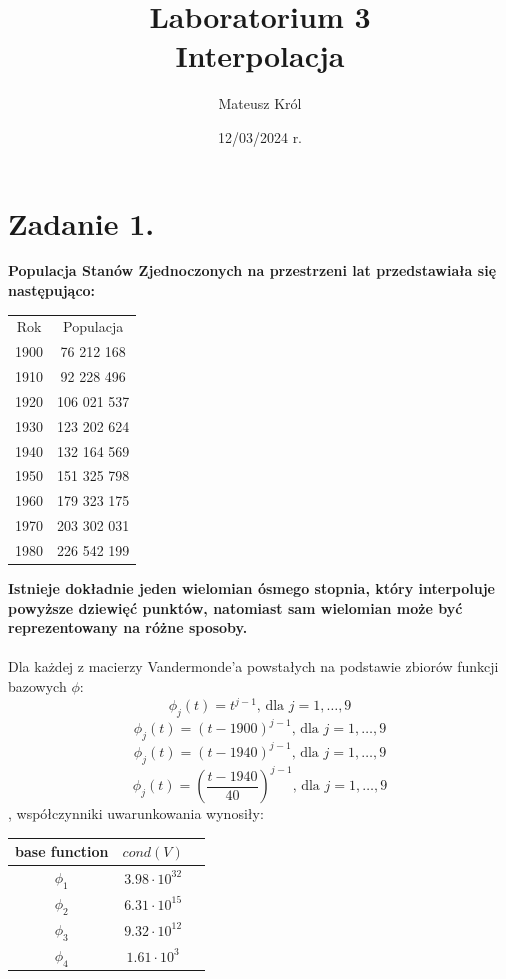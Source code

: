 \documentclass{article}
\title{%
Laboratorium 3\\
  \huge Interpolacja}
\author{Mateusz Król}
\date{12/03/2024 r.}
\begin{document}
\maketitle


\section*{Zadanie 1.}
\textbf{Populacja Stanów Zjednoczonych na przestrzeni lat przedstawiała
się następująco:}
\begin{center}
  \begin{tabular}{c c} 
   Rok & Populacja\\
   1900 & 76 212 168\\
   1910 & 92 228 496\\
   1920 & 106 021 537\\
   1930 & 123 202 624\\
   1940 & 132 164 569\\
   1950 & 151 325 798\\
   1960 & 179 323 175\\
   1970 & 203 302 031\\
   1980 &226 542 199
  \end{tabular}
\end{center}
\textbf{Istnieje dokładnie jeden wielomian ósmego stopnia, który interpoluje
 powyższe dziewięć punktów, natomiast sam wielomian może być reprezentowany na różne sposoby.}
\\\\
Dla każdej z macierzy Vandermonde'a powstałych na podstawie zbiorów funkcji 
bazowych $\phi$:
$$ \phi_j(t) = t^{j-1}\mbox{, dla } j = 1,\dots,9$$
$$ \phi_j(t) = (t-1900)^{j-1}\mbox{, dla } j = 1,\dots,9$$
$$ \phi_j(t) = (t-1940)^{j-1}\mbox{, dla } j = 1,\dots,9$$
$$ \phi_j(t) = \left(\frac{t-1940}{40}\right)^{j-1} \mbox{, dla } j = 1,\dots,9$$
, współczynniki uwarunkowania wynosiły:
\begin{center}
  \begin{tabular}{  |c|c|c| } 
   \hline
   base function & $cond(V)$\\
   \hline
   $\phi_1$ & $3.98 \cdot 10^{32}$ \\
   \hline
   $\phi_2$ & $6.31 \cdot 10^{15}$ \\
   \hline
   $\phi_3$ & $9.32 \cdot 10^{12}$ \\
   \hline
   $\phi_4$ & $1.61 \cdot 10^{3}$ \\
   \hline
  \end{tabular}
\end{center}
\end{document}
